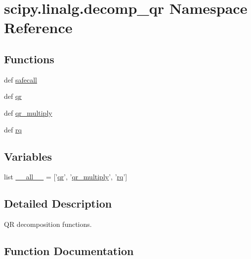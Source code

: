 \hypertarget{namespacescipy_1_1linalg_1_1decomp__qr}{}\section{scipy.\+linalg.\+decomp\+\_\+qr Namespace Reference}
\label{namespacescipy_1_1linalg_1_1decomp__qr}
\subsection*{Functions}
\begin{DoxyCompactItemize}
\item 
def \hyperlink{namespacescipy_1_1linalg_1_1decomp__qr_a9cbbae320a41c14f8ea6f37a436bc5de}{safecall}
\item 
def \hyperlink{namespacescipy_1_1linalg_1_1decomp__qr_a6e131e925d4d63cf2052982c4f9458b3}{qr}
\item 
def \hyperlink{namespacescipy_1_1linalg_1_1decomp__qr_abf8496a99c592d34da97cdb5ba19fed4}{qr\+\_\+multiply}
\item 
def \hyperlink{namespacescipy_1_1linalg_1_1decomp__qr_a508d88a8287c253cab142b376283ccef}{rq}
\end{DoxyCompactItemize}
\subsection*{Variables}
\begin{DoxyCompactItemize}
\item 
list \hyperlink{namespacescipy_1_1linalg_1_1decomp__qr_a563589e815942fd816c73c55d5ef4e70}{\+\_\+\+\_\+all\+\_\+\+\_\+} = \mbox{[}'\hyperlink{namespacescipy_1_1linalg_1_1decomp__qr_a6e131e925d4d63cf2052982c4f9458b3}{qr}', '\hyperlink{namespacescipy_1_1linalg_1_1decomp__qr_abf8496a99c592d34da97cdb5ba19fed4}{qr\+\_\+multiply}', '\hyperlink{namespacescipy_1_1linalg_1_1decomp__qr_a508d88a8287c253cab142b376283ccef}{rq}'\mbox{]}
\end{DoxyCompactItemize}


\subsection{Detailed Description}
\begin{DoxyVerb}QR decomposition functions.\end{DoxyVerb}
 

\subsection{Function Documentation}
\hypertarget{namespacescipy_1_1linalg_1_1decomp__qr_a6e131e925d4d63cf2052982c4f9458b3}{}
